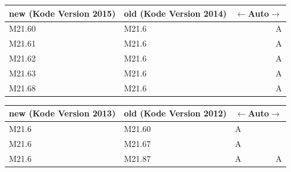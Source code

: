 \begin{centernss}
\renewcommand{\arraystretch}{1.2}
\begin{tabular}{p{136pt}p{136pt}lr}
new (Kode Version 2015) & old (Kode Version 2014) & \multicolumn{2}{c}{$\leftarrow$Auto$\rightarrow$} \\
\hline
M21.60 & M21.6 & & A \\
M21.61 & M21.6 & & A \\
M21.62 & M21.6 & & A \\
M21.63 & M21.6 & & A \\
M21.68 & M21.6 & & A \\
\end{tabular}
\end{centernss}

\begin{centernss}
\renewcommand{\arraystretch}{1.2}
\begin{tabular}{p{136pt}p{136pt}lr}
new (Kode Version 2013) & old (Kode Version 2012) & \multicolumn{2}{c}{$\leftarrow$Auto$\rightarrow$} \\
\hline
M21.6 & M21.60 & A &  \\
M21.6 & M21.67 & A &  \\
M21.6 & M21.87 & A & A \\
\end{tabular}
\end{centernss}

